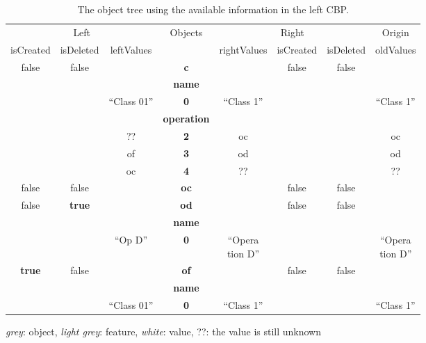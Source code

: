 \documentclass{llncs}
\begin{document}
\begin{table}
    \centering
    \begin{footnotesize}
        \caption{The object tree using the available information in the left CBP.}
        \label{table:left_object_tree}
        \begin{tabular}{  c  c  c  c  c  c  c  c  }
            \hline
            \multicolumn{3}{c}{Left} & \multirow{2}{*}{Objects} & \multicolumn{3}{c}{Right} & Origin\\
            \hhline{---~----}
            isCreated & isDeleted & leftValues & & rightValues & isCreated & isDeleted & oldValues\\
            \hline
            \rowcolor{gray1}
            false & false & & \textbf{\textsf{c}} & & false & false & \\
            \rowcolor{gray2}
            & & & \textbf{\textsf{name}} & & & & \\
            & & ``Class 01'' & \textbf{0} & ``Class 1'' & & & ``Class 1'' \\
            \rowcolor{gray2}
            & & & \textbf{\textsf{operation}} & & & & \\
            & & ?? & \textbf{\small{2}} & oc & & & oc \\
            & & of & \textbf{\small{3}} & od & & & od \\
            & & oc & \textbf{\small{4}} & ?? & & & ?? \\
            \hline
            \rowcolor{gray1}
            false & false & & \textbf{\textsf{oc}} & & false & false & \\
            \hline
            \rowcolor{gray1}
            false & \textbf{true} & & \textbf{\textsf{od}} & & false & false & \\
            \rowcolor{gray2}
            & & & \textbf{\textsf{name}} & & & & \\
            & & ``Op D'' & \textbf{0} & \makecell{``Opera\\tion D''} & & & \makecell{``Opera\\tion D''} \\
            \hline
            \rowcolor{gray1}
            \textbf{true} & false & & \textbf{\textsf{of}} & & false & false & \\
            \rowcolor{gray2}
            & & & \textbf{\textsf{name}} & & & & \\
            & & ``Class 01'' & \textbf{0} & ``Class 1'' & & & ``Class 1'' \\
            \hline
        \end{tabular}
        \begin{flushright}
            \textit{grey}: object, \textit{light grey}: feature, \textit{white}: value, ??: the value is still unknown
        \end{flushright}
    \end{footnotesize}
\end{table}
\end{document}
